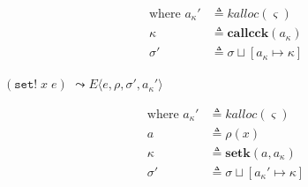 \documentclass[12pt,draft]{article}
\newcommand{\setsyn}[2]{(\texttt{set!}\;#1\;#2)}
\newcommand{\env}[0]{\rho}
\newcommand{\store}[0]{\sigma}
\newcommand{\baddr}[0]{a}
\newcommand{\kaddr}[0]{a_{\kappa}}
\newcommand{\kont}[0]{\kappa}
\newcommand{\state}[0]{\varsigma}
\newcommand{\E}[4]{E\langle #1 , #2 , #3 , #4 \rangle}
\begin{document}
{\begin{multicols*}{2}
\begin{center}
\end{center}
\vspace{-5mm}
\begin{align*}
  \text{where }
  \kaddr' &\triangleq kalloc(\state) \\
  \kont &\triangleq \textbf{callcck}(\kaddr) \\
  \store' &\triangleq \store \sqcup [\kaddr \mapsto \kont]
\end{align*}
\begin{center}
  $\setsyn{x}{e}$
  $\leadsto \E{e}{\env}{\store'}{\kaddr'}$
\end{center}
\vspace{-5mm}
\begin{align*}
  \text{where }
  \kaddr' &\triangleq kalloc(\state) \\
  \baddr &\triangleq \env(x) \\
  \kont &\triangleq \textbf{setk}(\baddr , \kaddr) \\
  \store' &\triangleq \store \sqcup [\kaddr' \mapsto \kont]
\end{align*}


\vfill\null
\columnbreak


\end{multicols*}}
\end{document}
